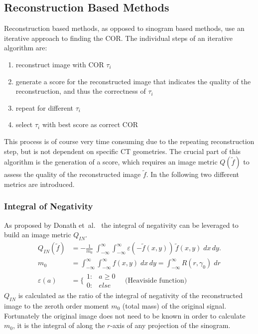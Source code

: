\documentclass[10pt,journal,compsoc]{IEEEtran}
\begin{document}
\subsection{Reconstruction Based Methods}\label{ssec:reconstructionbasedmethods}
Reconstruction based methods, as opposed to sinogram based methods, use an iterative approach to finding the COR.
The individual steps of an iterative algorithm are:
\begin{enumerate}
\item reconstruct image with COR $\tau_i$
\item generate a score for the reconstructed image that indicates the quality of the reconstruction, and thus the correctness of $\tau_i$
\item repeat for different $\tau_i$
\item select $\tau_i$ with best score as correct COR
\end{enumerate}
This process is of course very time consuming due to the repeating reconstruction step, but is not dependent on specific CT geometries.
The crucial part of this algorithm is the generation of a score, which requires an image metric $Q(\tilde{f})$ to assess the quality of the reconstructed image $\tilde{f}$.
In the following two different metrics are introduced.


\subsubsection{Integral of Negativity}\label{sssec:qin}
As proposed by Donath et~al.~\cite{donath2006} the integral of negativity can be leveraged to build an image metric $Q_{IN}$.
%
\begin{align}
Q_{IN}(\tilde{f}) &= -\frac{1}{m_0}\;\int_{-\infty}^{\infty}\int_{-\infty}^{\infty}\varepsilon(-\tilde{f}(x,y))\,\tilde{f}(x,y)\;dx\,dy.
\\
m_0 &= \int_{-\infty}^{\infty}\int_{-\infty}^{\infty}f(x,y)\;dx\,dy = \int_{-\infty}^{\infty} R(r,\gamma_0)\;dr
\\
\varepsilon(a) &= \bigg\{
\begin{matrix}
1: & a \geq 0 \\
0: & else
\end{matrix}\quad \text{(Heaviside function)} 
\end{align}
%
$Q_{IN}$ is calculated as the ratio of the integral of negativity of the reconstructed image to the zeroth order moment $m_0$ (total mass) of the original signal. 
Fortunately the original image does not need to be known in order to calculate $m_0$, it is the integral of along the $r$-axis of any projection of the sinogram.
\end{document}
